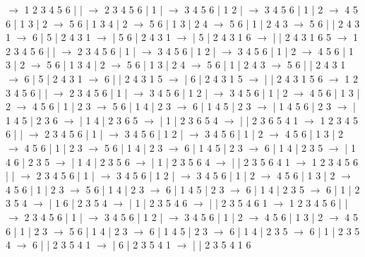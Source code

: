 \documentclass{article}
\begin{document}
\newline
 $\rightarrow$ 1 2 3 4 5 6 |  |  $\rightarrow$ 2 3 4 5 6 | 1 |  $\rightarrow$ 3 4 5 6 | 1 2 |  $\rightarrow$ 3 4 5 6 | 1 | 2 $\rightarrow$ 4 5 6 | 1 3 | 2 $\rightarrow$ 5 6 | 1 3 4 | 2 $\rightarrow$ 5 6 | 1 3 | 2 4 $\rightarrow$ 5 6 | 1 | 2 4 3 $\rightarrow$ 5 6 |  | 2 4 3 1 $\rightarrow$ 6 | 5 | 2 4 3 1 $\rightarrow$  | 5 6 | 2 4 3 1 $\rightarrow$  | 5 | 2 4 3 1 6 $\rightarrow$  |  | 2 4 3 1 6 5
\newline
 $\rightarrow$ 1 2 3 4 5 6 |  |  $\rightarrow$ 2 3 4 5 6 | 1 |  $\rightarrow$ 3 4 5 6 | 1 2 |  $\rightarrow$ 3 4 5 6 | 1 | 2 $\rightarrow$ 4 5 6 | 1 3 | 2 $\rightarrow$ 5 6 | 1 3 4 | 2 $\rightarrow$ 5 6 | 1 3 | 2 4 $\rightarrow$ 5 6 | 1 | 2 4 3 $\rightarrow$ 5 6 |  | 2 4 3 1 $\rightarrow$ 6 | 5 | 2 4 3 1 $\rightarrow$ 6 |  | 2 4 3 1 5 $\rightarrow$  | 6 | 2 4 3 1 5 $\rightarrow$  |  | 2 4 3 1 5 6
\newline
 $\rightarrow$ 1 2 3 4 5 6 |  |  $\rightarrow$ 2 3 4 5 6 | 1 |  $\rightarrow$ 3 4 5 6 | 1 2 |  $\rightarrow$ 3 4 5 6 | 1 | 2 $\rightarrow$ 4 5 6 | 1 3 | 2 $\rightarrow$ 4 5 6 | 1 | 2 3 $\rightarrow$ 5 6 | 1 4 | 2 3 $\rightarrow$ 6 | 1 4 5 | 2 3 $\rightarrow$  | 1 4 5 6 | 2 3 $\rightarrow$  | 1 4 5 | 2 3 6 $\rightarrow$  | 1 4 | 2 3 6 5 $\rightarrow$  | 1 | 2 3 6 5 4 $\rightarrow$  |  | 2 3 6 5 4 1
\newline
 $\rightarrow$ 1 2 3 4 5 6 |  |  $\rightarrow$ 2 3 4 5 6 | 1 |  $\rightarrow$ 3 4 5 6 | 1 2 |  $\rightarrow$ 3 4 5 6 | 1 | 2 $\rightarrow$ 4 5 6 | 1 3 | 2 $\rightarrow$ 4 5 6 | 1 | 2 3 $\rightarrow$ 5 6 | 1 4 | 2 3 $\rightarrow$ 6 | 1 4 5 | 2 3 $\rightarrow$ 6 | 1 4 | 2 3 5 $\rightarrow$  | 1 4 6 | 2 3 5 $\rightarrow$  | 1 4 | 2 3 5 6 $\rightarrow$  | 1 | 2 3 5 6 4 $\rightarrow$  |  | 2 3 5 6 4 1
\newline
 $\rightarrow$ 1 2 3 4 5 6 |  |  $\rightarrow$ 2 3 4 5 6 | 1 |  $\rightarrow$ 3 4 5 6 | 1 2 |  $\rightarrow$ 3 4 5 6 | 1 | 2 $\rightarrow$ 4 5 6 | 1 3 | 2 $\rightarrow$ 4 5 6 | 1 | 2 3 $\rightarrow$ 5 6 | 1 4 | 2 3 $\rightarrow$ 6 | 1 4 5 | 2 3 $\rightarrow$ 6 | 1 4 | 2 3 5 $\rightarrow$ 6 | 1 | 2 3 5 4 $\rightarrow$  | 1 6 | 2 3 5 4 $\rightarrow$  | 1 | 2 3 5 4 6 $\rightarrow$  |  | 2 3 5 4 6 1
\newline
 $\rightarrow$ 1 2 3 4 5 6 |  |  $\rightarrow$ 2 3 4 5 6 | 1 |  $\rightarrow$ 3 4 5 6 | 1 2 |  $\rightarrow$ 3 4 5 6 | 1 | 2 $\rightarrow$ 4 5 6 | 1 3 | 2 $\rightarrow$ 4 5 6 | 1 | 2 3 $\rightarrow$ 5 6 | 1 4 | 2 3 $\rightarrow$ 6 | 1 4 5 | 2 3 $\rightarrow$ 6 | 1 4 | 2 3 5 $\rightarrow$ 6 | 1 | 2 3 5 4 $\rightarrow$ 6 |  | 2 3 5 4 1 $\rightarrow$  | 6 | 2 3 5 4 1 $\rightarrow$  |  | 2 3 5 4 1 6
\end{document}
